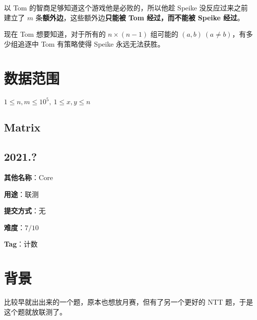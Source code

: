 \documentclass[a4paper,10pt]{article}
\begin{document}
以 Tom 的智商足够知道这个游戏他是必败的，所以他趁 Speike 没反应过来之前建立了 $m$ 条\textbf{额外边}，这些额外边\textbf{只能被 Tom 经过，而不能被 Speike 经过}。

现在 Tom 想要知道，对于所有的 $n\times (n-1)$ 组可能的 $(a,b)\ (a\ne b)$，有多少组追逐中 Tom 有策略使得 Speike 永远无法获胜。

\section*{数据范围}

$1\leq n,m\leq 10^5,\ 1\leq x,y\leq n$

\newpage

\vspace*{\fill}
\begin{center}

\section{Matrix}

\subsection*{2021.?}

\vspace{10pt}

\textbf{其他名称}：Core

\vspace{10pt}

\textbf{用途}：联测

\vspace{10pt}

\textbf{提交方式}：无

\vspace{10pt}

\textbf{难度}：$7/10$

\vspace{10pt}

\textbf{Tag}：计数

\end{center}
\vspace*{\fill}

\newpage

\section*{背景}

比较早就出出来的一个题，原本也想放月赛，但有了另一个更好的 NTT 题，于是这个题就放联测了。
\end{document}

